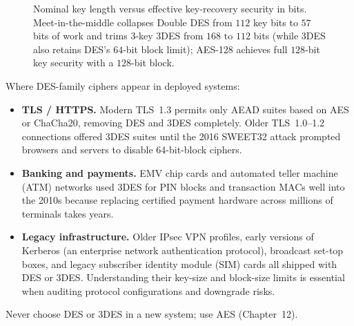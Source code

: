 \begin{figure}[htbp]
\centering
{}
\caption{Nominal key length versus effective key-recovery security in bits. Meet-in-the-middle collapses Double DES from $112$ key bits to $57$ bits of work and trims 3-key 3DES from $168$ to $112$ bits (while 3DES also retains DES's $64$-bit block limit); AES-128 achieves full $128$-bit key security with a $128$-bit block.}
\label{ch11:fig-des-variants}
\end{figure}

\begin{applicationbox}
Where DES-family ciphers appear in deployed systems:
\begin{itemize}
  \item \textbf{TLS / HTTPS.} Modern TLS~1.3 permits only AEAD suites based on AES or ChaCha20, removing DES and 3DES completely. Older TLS~1.0--1.2 connections offered 3DES suites until the 2016 SWEET32 attack prompted browsers and servers to disable 64-bit-block ciphers.
  \item \textbf{Banking and payments.} EMV chip cards and automated teller machine (ATM) networks used 3DES for PIN blocks and transaction MACs well into the 2010s because replacing certified payment hardware across millions of terminals takes years.
  \item \textbf{Legacy infrastructure.} Older IPsec VPN profiles, early versions of Kerberos (an enterprise network authentication protocol), broadcast set-top boxes, and legacy subscriber identity module (SIM) cards all shipped with DES or 3DES. Understanding their key-size and block-size limits is essential when auditing protocol configurations and downgrade risks.
\end{itemize}
Never choose DES or 3DES in a new system; use AES (Chapter~12).
\end{applicationbox}

